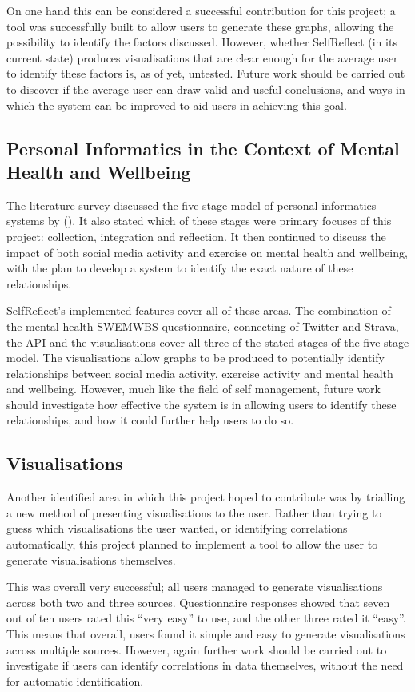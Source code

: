 \documentclass[11pt,openright,a4paper]{report}
\begin{document}
On one hand this can be considered a successful contribution for this project; a tool was successfully built to allow users to generate these graphs, allowing the possibility to identify the factors discussed. However, whether SelfReflect (in its current state) produces visualisations that are clear enough for the average user to identify these factors is, as of yet, untested. Future work should be carried out to discover if the average user can draw valid and useful conclusions, and ways in which the system can be improved to aid users in achieving this goal.

\subsection{Personal Informatics in the Context of Mental Health and Wellbeing}
The literature survey discussed the five stage model of personal informatics systems by \citeauthor{li2010stage} (\citeyear{li2010stage}). It also stated which of these stages were primary focuses of this project: collection, integration and reflection. It then continued to discuss the impact of both social media activity and exercise on mental health and wellbeing, with the plan to develop a system to identify the exact nature of these relationships.

SelfReflect's implemented features cover all of these areas. The combination of the mental health SWEMWBS questionnaire, connecting of Twitter and Strava, the API and the visualisations cover all three of the stated stages of the five stage model. The visualisations allow graphs to be produced to potentially identify relationships between social media activity, exercise activity and mental health and wellbeing. However, much like the field of self management, future work should investigate how effective the system is in allowing users to identify these relationships, and how it could further help users to do so.

\subsection{Visualisations}
Another identified area in which this project hoped to contribute was by trialling a new method of presenting visualisations to the user. Rather than trying to guess which visualisations the user wanted, or identifying correlations automatically, this project planned to implement a tool to allow the user to generate visualisations themselves.

This was overall very successful; all users managed to generate visualisations across both two and three sources. Questionnaire responses showed that seven out of ten users rated this \enquote{very easy} to use, and the other three rated it \enquote{easy}. This means that overall, users found it simple and easy to generate visualisations across multiple sources. However, again further work should be carried out to investigate if users can identify correlations in data themselves, without the need for automatic identification.
\end{document}

